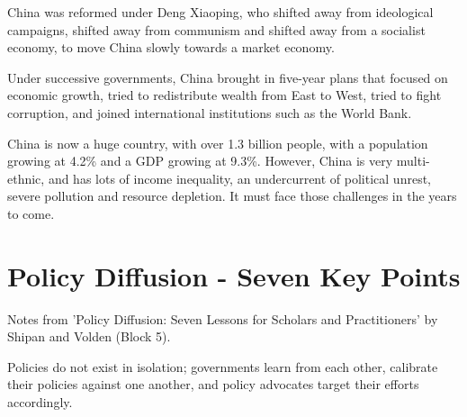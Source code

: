China was reformed under Deng Xiaoping, who shifted away from
ideological campaigns, shifted away from communism and shifted away
from a socialist economy, to move China slowly towards a market
economy.


Under successive governments, China brought in five-year plans that
focused on economic growth, tried to redistribute wealth from East to
West, tried to fight corruption, and joined international institutions
such as the World Bank.


China is now a huge country, with over 1.3 billion people, with a
population growing at 4.2\% and a GDP growing at 9.3\%. However, China
is very multi-ethnic, and has lots of income inequality, an
undercurrent of political unrest, severe pollution and resource
depletion. It must face those challenges in the years to come.

\section{Policy Diffusion - Seven Key Points}
\begin{flushright}
  \scriptsize Notes from 'Policy Diffusion: Seven Lessons for Scholars
  and Practitioners' by Shipan and Volden (Block 5).
\end{flushright}


Policies do not exist in isolation; governments learn from each other,
calibrate their policies against one another, and policy advocates
target their efforts accordingly.

